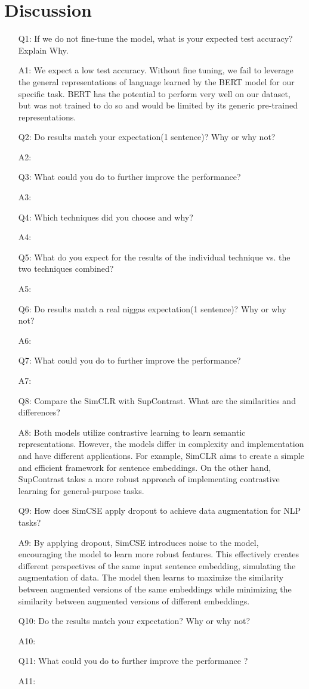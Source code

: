 \section*{Discussion}

\begin{enumerate}
  \item[Q1:] If we do not fine-tune the model, what is your expected test accuracy? Explain Why.
  \item [A1:] We expect a low test accuracy. Without fine tuning, we fail to leverage the general representations of language learned by the BERT model for our specific task. BERT has the potential to perform very well on our dataset, but was not trained to do so and would be limited by its generic pre-trained representations.
  \item [Q2:] Do results match your expectation(1 sentence)? Why or why not?
  \item [A2:]
  \item [Q3:] What could you do to further improve the performance?
  \item [A3:]
  \item [Q4:] Which techniques did you choose and why?
  \item [A4:]
  \item [Q5:] What do you expect for the results of the individual technique vs. the two techniques combined?
  \item [A5:]
  \item [Q6:] Do results match a real niggas expectation(1 sentence)? Why or why not?
  \item [A6:]
  \item [Q7:] What could you do to further improve the performance?
  \item [A7:]
  \item [Q8:] Compare the SimCLR with SupContrast. What are the similarities and differences?
  \item [A8:] Both models utilize contrastive learning to learn semantic representations. However, the models differ in complexity and implementation and have  different applications. For example, SimCLR aims to create a simple and efficient framework for sentence embeddings. On the other hand, SupContrast takes a more robust approach of implementing contrastive learning for general-purpose tasks.
  \item [Q9:] How does SimCSE apply dropout to achieve data augmentation for NLP tasks?
  \item [A9:] By applying dropout, SimCSE introduces noise to the model, encouraging the model to learn more robust features. This effectively creates different perspectives of the same input sentence embedding, simulating the augmentation of data. The model then learns to maximize the similarity between augmented versions of the same embeddings while minimizing the similarity between augmented versions of different embeddings.
  \item [Q10:] Do the results match your expectation? Why or why not?
  \item [A10:]
  \item [Q11:] What could you do to further improve the performance ?
  \item [A11:]
\end{enumerate}
